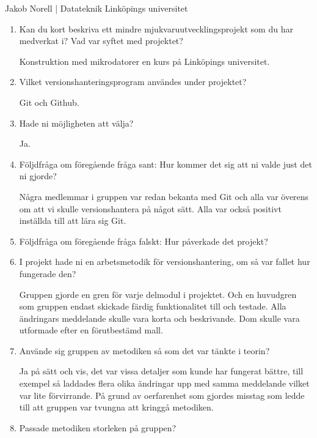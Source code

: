 \vspace{3em}
\begin{center}
    Jakob Norell | Datateknik Linköpings universitet
\end{center}
\begin{enumerate}

  \item Kan du kort beskriva ett mindre mjukvaruutvecklingsprojekt som du har medverkat i? Vad var syftet med projektet?

  Konstruktion med mikrodatorer en kurs på Linköpings universitet.

  \item Vilket versionshanteringsprogram användes under projektet?

  Git och Github.

  \item Hade ni möjligheten att välja?

  Ja.

  \item Följdfråga om föregående fråga sant: Hur kommer det sig att ni valde just det ni gjorde?

  Några medlemmar i gruppen var redan bekanta med Git och alla var överens om att vi skulle versionshantera på något sätt. Alla var också positivt inställda till att lära sig Git.

  \item Följdfråga om föregående fråga falskt: Hur påverkade det projekt?

  \item I projekt hade ni en arbetsmetodik för versionshantering, om så var fallet hur fungerade den?

  Gruppen gjorde en gren för varje delmodul i projektet. Och en huvudgren som gruppen endast skickade färdig funktionalitet till och testade. Alla ändringars meddelande skulle vara korta och beskrivande. Dom skulle vara utformade efter en förutbestämd mall.

  \item Använde sig gruppen av metodiken så som det var tänkte i teorin?

  Ja på sätt och vis, det var vissa detaljer som kunde har fungerat bättre, till exempel så laddades flera olika ändringar upp med samma meddelande vilket var lite förvirrande. På grund av oerfarenhet som gjordes misstag som ledde till att gruppen var tvungna att kringgå metodiken.

  \item Passade metodiken storleken på gruppen?


\end{enumerate}

